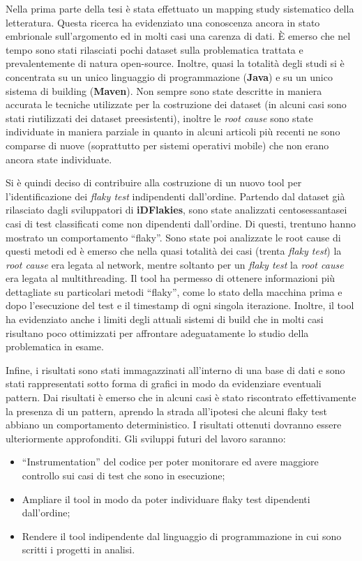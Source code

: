 \fancyhf{}
\fancyhead[C]{}
\fancyfoot[C]{\thepage}
\pagestyle{fancy}
Nella prima parte della tesi è stata effettuato un mapping study sistematico della letteratura. Questa ricerca ha evidenziato una conoscenza ancora in stato embrionale sull’argomento ed in molti casi una carenza di dati. È emerso che nel tempo sono stati rilasciati pochi dataset sulla problematica trattata e prevalentemente di natura open-source. Inoltre, quasi la totalità degli studi si è concentrata su un unico linguaggio di programmazione (\textbf{Java}) e su un unico sistema di building (\textbf{Maven}). Non sempre sono state descritte in maniera accurata le tecniche utilizzate per la costruzione dei dataset (in alcuni casi sono stati riutilizzati dei dataset preesistenti), inoltre le \emph{root cause} sono state individuate in maniera parziale in quanto in alcuni articoli più recenti ne sono comparse di nuove (soprattutto per sistemi operativi mobile) che non erano ancora state individuate.

Si è quindi deciso di contribuire alla costruzione di un nuovo tool per l’identificazione dei \emph{flaky test} indipendenti dall’ordine. Partendo dal dataset già rilasciato dagli sviluppatori di \textbf{iDFlakies}, sono state analizzati centosessantasei casi di test classificati come non dipendenti dall’ordine. Di questi, trentuno hanno mostrato un comportamento “flaky”. Sono state poi analizzate le root cause di questi metodi ed è emerso che nella quasi totalità dei casi (trenta \emph{flaky test}) la \emph{root cause} era legata al network, mentre soltanto per un \emph{flaky test} la \emph{root cause} era legata al multithreading. Il tool ha permesso di ottenere informazioni più dettagliate su particolari metodi “flaky”, come lo stato della macchina prima e dopo l’esecuzione del test e il timestamp di ogni singola iterazione. Inoltre, il tool ha evidenziato anche i limiti degli attuali sistemi di build che in molti casi risultano poco ottimizzati per affrontare adeguatamente lo studio della problematica in esame.

Infine, i risultati sono stati immagazzinati all’interno di una base di dati e sono
stati rappresentati sotto forma di grafici in modo da evidenziare eventuali pattern. Dai risultati è emerso che in alcuni casi è stato riscontrato effettivamente la presenza di un pattern, aprendo la strada all’ipotesi che alcuni flaky test abbiano un comportamento deterministico. I risultati ottenuti dovranno essere ulteriormente approfonditi.
Gli sviluppi futuri del lavoro saranno:
\begin{itemize}
\item “Instrumentation” del codice per poter monitorare ed avere maggiore controllo sui casi di test che sono in esecuzione;
\item Ampliare il tool in modo da poter individuare flaky test dipendenti dall’ordine;
\item Rendere il tool indipendente dal linguaggio di programmazione in cui sono scritti i progetti in analisi.
\end{itemize}